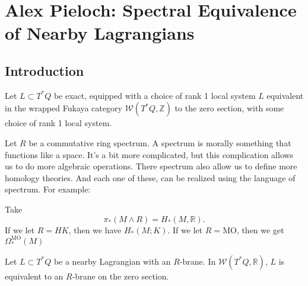 \chapter{Alex Pieloch: Spectral Equivalence of Nearby Lagrangians}
\label{pieloch}
    

\section{Introduction}
\begin{theorem}
[Abouzaid]

Let $L\subset T^* Q$ be exact, equipped with a choice of rank 1 local system $L$ equivalent in the wrapped Fukaya category $\mathcal{W}(T^* Q, \mathbb{Z})$ to the zero section, with some choice of rank 1 local system.

\end{theorem}

Let $R$ be a commutative ring spectrum. A spectrum is morally something that functions like a space. It's a bit more complicated, but this complication allows us to do more algebraic operations. There spectrum also allow us to define more homology theories. And each one of these, can be realized using the language of spectrum. For example:

\begin{example}

Take
\[
\pi_*(M\wedge R) = H_*(M, \mathbb{R}).
\]
If we let $R=HK$, then we have $H_*(M;K)$. If we let $R=\text{MO}$, then we get $\Omega_*^{\text{MO}}(M)$

\end{example}

\begin{theorem}

Let $L\subset T^*Q$ be a nearby Lagrangian with an $R$-brane. In $\mathcal{W}(T^*Q, \mathbb{R})$, $L$ is equivalent to an $R$-brane on the zero section.

\end{theorem}

